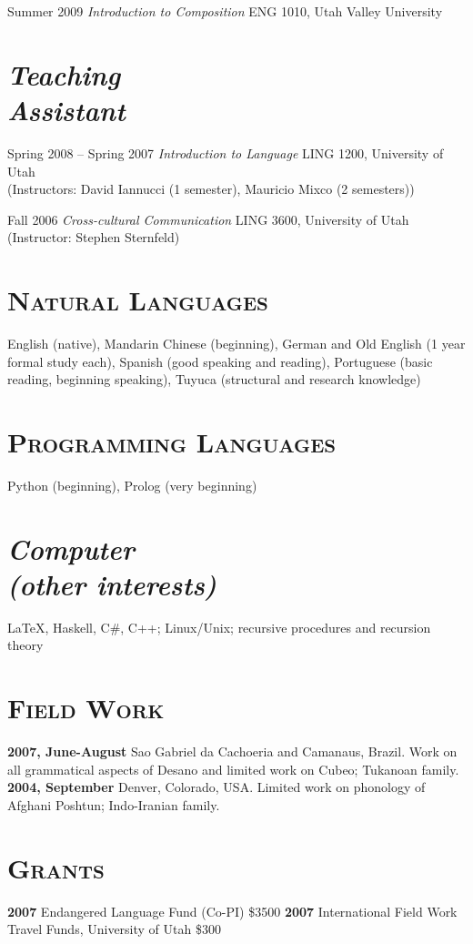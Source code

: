 \documentclass{resume}
\begin{document}
\begin{resume}
Summer 2009 \emph{Introduction to Composition} ENG 1010, Utah Valley University


{\section{\sl Teaching\\ Assistant}}
Spring 2008 -- Spring 2007 \emph{Introduction to Language} LING 1200, University of Utah\\
(Instructors: David Iannucci (1 semester), Mauricio Mixco (2 semesters))

Fall 2006 \emph{Cross-cultural Communication} LING 3600, University of Utah\\
(Instructor: Stephen Sternfeld)

\section{\textsc{Natural Languages}}
English (native), Mandarin Chinese (beginning), German and Old English (1 year formal study each), Spanish (good speaking and reading), Portuguese (basic reading, beginning speaking), Tuyuca (structural and research knowledge)

\section{\textsc{Programming Languages}}
Python (beginning), Prolog (very beginning) 

  
\section{{\sl Computer\\ (other interests)}} \LaTeX, Haskell, C\#, C++; Linux/Unix; recursive procedures and recursion theory\\

\section{\textsc{Field Work}}
{\bf 2007, June-August} Sao Gabriel da Cachoeria and Camanaus, Brazil. Work on all grammatical aspects of Desano and limited work on Cubeo; Tukanoan family. {\bf 2004, September} Denver, Colorado, USA. Limited work on phonology of Afghani Poshtun; Indo-Iranian family.


\section{\textsc{Grants}} 
{\bf 2007} Endangered Language Fund (Co-PI) \$3500  {\bf 2007} International Field Work Travel Funds, University of Utah \$300 



\end{resume}
\end{document}
